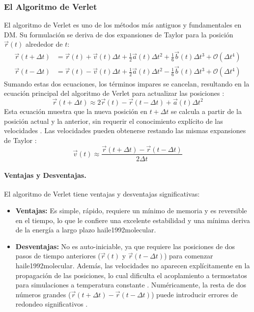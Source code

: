 \subsubsection{El Algoritmo de Verlet}

El algoritmo de Verlet es uno de los métodos más antiguos y fundamentales en DM. Su formulación se deriva de dos expansiones de Taylor para la posición $\vec{r}(t)$ alrededor de $t$:
\begin{align}
\vec{r}(t + \Delta t) &= \vec{r}(t) + \vec{v}(t)\Delta t + \frac{1}{2}\vec{a}(t)\Delta t^2 + \frac{1}{6}\vec{b}(t)\Delta t^3 + \mathcal{O}(\Delta t^4) \\
\vec{r}(t - \Delta t) &= \vec{r}(t) - \vec{v}(t)\Delta t + \frac{1}{2}\vec{a}(t)\Delta t^2 - \frac{1}{6}\vec{b}(t)\Delta t^3 + \mathcal{O}(\Delta t^4)
\end{align}
Sumando estas dos ecuaciones, los términos impares se cancelan, resultando en la ecuación principal del algoritmo de Verlet para actualizar las posiciones \cite[25]{allen2012computer}:
\begin{equation}
\vec{r}(t + \Delta t) \approx 2\vec{r}(t) - \vec{r}(t - \Delta t) + \vec{a}(t)\Delta t^2
\label{eq:verlet_pos}
\end{equation}
Esta ecuación muestra que la nueva posición en $t+\Delta t$ se calcula a partir de la posición actual y la anterior, sin requerir el conocimiento explícito de las velocidades \cite[176]{haile1992molecular}. Las velocidades pueden obtenerse restando las mismas expansiones de Taylor \cite[25]{allen2012computer}:
\begin{equation}
\vec{v}(t) \approx \frac{\vec{r}(t + \Delta t) - \vec{r}(t - \Delta t)}{2\Delta t}
\end{equation}

\paragraph{Ventajas y Desventajas.}
El algoritmo de Verlet tiene ventajas y desventajas significativas:
\begin{itemize}
    \item \textbf{Ventajas:} Es simple, rápido, requiere un mínimo de memoria y es reversible en el tiempo, lo que le confiere una excelente estabilidad y una mínima deriva de la energía a largo plazo \cite[112,176]{frenkel2002understanding}{haile1992molecular}.
    \item \textbf{Desventajas:} No es auto-iniciable, ya que requiere las posiciones de dos pasos de tiempo anteriores ($\vec{r}(t)$ y $\vec{r}(t-\Delta t)$) para comenzar \cite[176]{haile1992molecular}{haile1992molecular}. Además, las velocidades no aparecen explícitamente en la propagación de las posiciones, lo cual dificulta el acoplamiento a termostatos para simulaciones a temperatura constante \cite[452]{jensen2017introduction}. Numéricamente, la resta de dos números grandes ($\vec{r}(t + \Delta t) - \vec{r}(t - \Delta t)$) puede introducir errores de redondeo significativos \cite[452]{jensen2017introduction}.
\end{itemize}

